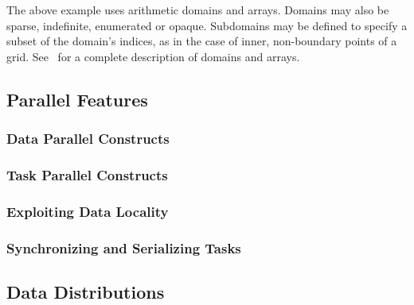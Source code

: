 The above example uses arithmetic domains and arrays.  Domains may
also be sparse, indefinite, enumerated or opaque.  Subdomains may be
defined to specify a subset of the domain's indices, as in the case of
inner, non-boundary points of a grid.  See~ for
a complete description of domains and arrays.
 
\subsection{Parallel Features}
\label{Parallel_Features}


\subsubsection{Data Parallel Constructs}
\label{Data_Parallel_Constructs}


\subsubsection{Task Parallel Constructs}
\label{Task_Parallel_Constructs}


\subsubsection{Exploiting Data Locality}
\label{Exploiting_Data_Locality}


\subsubsection{Synchronizing and Serializing Tasks}
\label{Synchronizing_and_Serializing_Tasks}


\subsection{Data Distributions}
\label{Data_Distributions}

